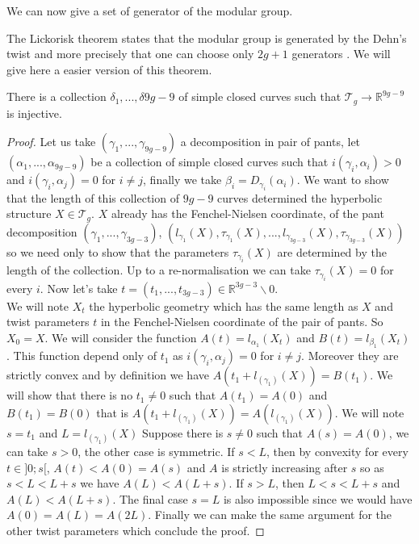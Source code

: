 We can now give a set of generator of the modular group.

\begin{rmq}
The Lickorisk theorem states that the modular group is generated by the Dehn's twist and more precisely that one can choose only $2g+1$ generators \cite{Lickorish1964AFS}. We will give here a easier version of this theorem.
\end{rmq}

\begin{thm}
There is a collection $\delta_{1},...,\delta{9g-9}$ of simple closed curves such that $\mathcal{T}_{g} \to \mathbb{R}^{9g-9}$ is injective.
\end{thm}

\begin{proof}
Let us take $(\gamma_1,...,\gamma_{9g-9})$ a decomposition in pair of pants, let $(\alpha_1,...,\alpha_{9g-9})$ be a collection of simple closed curves such that $i(\gamma_i,\alpha_i) > 0$ and $i(\gamma_i,\alpha_j)=0$ for $i \neq j$, finally we take $\beta_i=D_{\gamma_i}(\alpha_i)$. We want to show that the length of this collection of $9g-9$ curves determined the hyperbolic structure $X \in \mathcal{T}_g$.
$X$ already has the Fenchel-Nielsen coordinate, of the pant decomposition $(\gamma_1,...,\gamma_{3g-3})$, $(l_{\gamma_1}(X),\tau_{\gamma_1}(X),...,l_{\gamma_{3g-3}}(X),\tau_{\gamma_{3g-3}}(X))$ so we need only to show that the parameters $\tau_{\gamma_i}(X)$ are determined by the length of the collection. Up to a re-normalisation we can take $\tau_{\gamma_i}(X)=0$ for every $i$. Now let's take $t=(t_1,...,t_{3g-3}) \in \mathbb{R}^{3g-3} \backslash 0$.\\
We will note $X_t$ the hyperbolic geometry which has the same length as $X$ and twist parameters $t$ in the Fenchel-Nielsen coordinate of the pair of pants. So $X_0 = X$. We will consider the function $A(t)=l_{\alpha_1}(X_t)$ and $B(t)=l_{\beta_1}(X_t)$. This function depend only of $t_1$ as $i(\gamma_i,\alpha_j)=0$ for $i \neq j$. Moreover they are strictly convex and by definition we have $A(t_1+l_(\gamma_1)(X))= B(t_1)$. We will show that there is no $t_1 \neq 0$ such that $A(t_1)=A(0)$ and $B(t_1)=B(0)$ that is $A(t_1+l_(\gamma_1)(X))=A(l_(\gamma_1)(X))$. We will note $s=t_1$ and $L=l_(\gamma_1)(X)$
Suppose there is $s \neq 0$ such that $A(s)=A(0)$, we can take $s > 0$, the other case is symmetric. If $s < L$, then by convexity for every $t \in ]0;s[$, $A(t) < A(0)=A(s)$ and $A$ is strictly increasing after $s$ so as $s < L < L+s$ we have $A(L)< A(L+s)$.
If $s > L$, then $L < s < L+s$ and  $A(L) < A(L+s)$. The final case $s=L$ is also impossible since we would have $A(0)=A(L)=A(2L)$.
Finally we can make the same argument for the other twist parameters which conclude the proof.
\end{proof}

